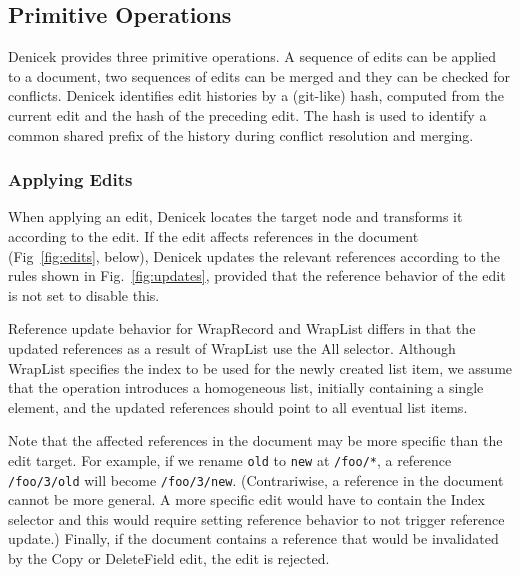 \documentclass[sigconf,anonymous,screen]{acmart}
\newcommand{\ident}[1]{{\sffamily #1}}
\begin{document}

\subsection{Primitive Operations}
\label{sec:system-ops}
Denicek provides three primitive operations. A sequence of edits can be applied to a
document, two sequences of edits can be merged and they can be checked for conflicts. Denicek
identifies edit histories by a (git-like) hash, computed from the current edit and the hash of the
preceding edit. The hash is used to identify a common shared prefix of the
history during conflict resolution and merging.

\subsubsection*{Applying Edits}
When applying an edit, Denicek locates the target node and transforms it according to the edit. If
the edit affects references in the document (Fig~\ref{fig:edits}, below), Denicek updates
the relevant references according to the rules shown in Fig.~\ref{fig:updates}, provided
that the reference behavior of the edit is not set to disable this.

Reference update behavior for \ident{WrapRecord} and \ident{WrapList} differs in that the updated
references as a result of \ident{WrapList} use the \ident{All} selector. Although \ident{WrapList}
specifies the index to be used for the newly created list item, we assume that the operation
introduces a homogeneous list, initially containing a single element, and the updated references
should point to all eventual list items.

Note that the affected references in the document may be more specific than the edit target. For
example, if we rename {\small\Verb|old|} to {\small\Verb|new|} at {\small\Verb|/foo/*|}, a reference
{\small\Verb|/foo/3/old|} will become {\small\Verb|/foo/3/new|}. (Contrariwise, a reference in the
document cannot be more general. A more specific edit would have to contain the \ident{Index} selector
and this would require setting reference behavior to not trigger reference update.) Finally,
if the document contains a reference that would be invalidated by the \ident{Copy} or
\ident{DeleteField} edit, the edit is rejected.
\end{document}
